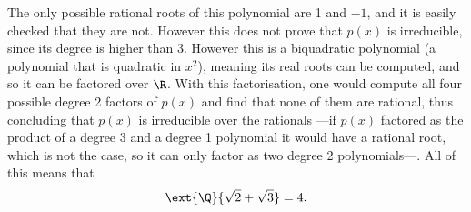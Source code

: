 \documentclass[12pt,oneside]{book}
\begin{document}
\begin{example}
\begin{points}
		The only possible rational roots of this polynomial are 1 and \( -1 \), and it is
		easily checked that they are not. However this does not prove that \( p(x) \) is
		irreducible, since its degree is higher than 3. However this is a biquadratic
		polynomial (a polynomial that is quadratic in \( x^2 \)), meaning its real roots can
		be computed, and so it can be factored over \( \R \). With this factorisation, one
		would	compute all four possible degree 2 factors of \( p(x) \) and find that none of
		them are rational, thus concluding that \( p(x) \) is irreducible over the rationals
		---if \( p(x) \) factored as the product of a degree 3 and a degree 1 polynomial it
		would have a rational root, which is not the case, so it can only factor as two degree
		2 polynomials---. All of this means that
		\begin{equation*}
			\ext{\Q}{\sqrt{2}+ \sqrt{3}} = 4.
		\end{equation*}
	\end{points}
\end{example}
\end{document}

